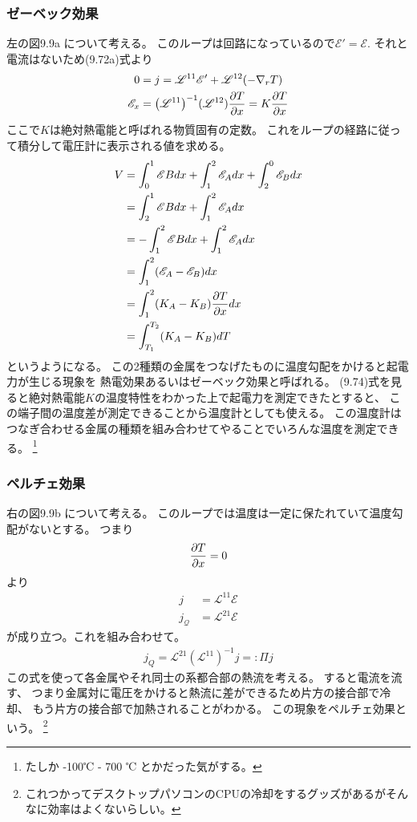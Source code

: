 \documentclass[11pt,dvipdfmx,a4paper]{jsarticle}
\begin{document}
\subsubsection*{ゼーベック効果}
左の図9.9a について考える。
このループは回路になっているので\(\mathscr{E}'=\mathscr{E}\).
それと電流はないため(9.72a)式より
\begin{align}
    0 &= j = \mathscr{L}^{11} \mathscr{E}' + \mathscr{L}^{12}(-\nabla_r T)\\ %
    \mathscr{E}_x &= \qty(\mathscr{L}^{11})^{-1}(\mathscr{L}^{12})\pdv{T}{x}
    = K \pdv{T}{x} %
\end{align}
ここで\(K\)は絶対熱電能と呼ばれる物質固有の定数。
これをループの経路に従って積分して電圧計に表示される値を求める。
\begin{align}
    V &= \int_0^1 \mathscr{E} B dx + \int_1^2 \mathscr{E}_A dx + \int_2^0 \mathscr{E}_B dx\\
    &= \int_2^1 \mathscr{E} B dx + \int_1^2 \mathscr{E}_A dx \\
    &= -\int_1^2 \mathscr{E} B dx + \int_1^2 \mathscr{E}_A dx \\
    &= \int_1^2 (\mathscr{E}_A-\mathscr{E}_B)dx\\
    &= \int_1^2(K_A-K_B)\pdv{T}{x} dx\\
    &= \int_{T_1}^{T_2} (K_A-K_B) dT %
\end{align}
というようになる。
この2種類の金属をつなげたものに温度勾配をかけると起電力が生じる現象を
熱電効果あるいはゼーベック効果と呼ばれる。
(9.74)式を見ると絶対熱電能\(K\)の温度特性をわかった上で起電力を測定できたとすると、
この端子間の温度差が測定できることから温度計としても使える。
この温度計はつなぎ合わせる金属の種類を組み合わせてやることでいろんな温度を測定できる。
\footnote{たしか -100℃ - 700 ℃ とかだった気がする。}

\subsubsection*{ペルチェ効果}
右の図9.9b について考える。
このループでは温度は一定に保たれていて温度勾配がないとする。
つまり
\begin{align}
    \pdv{T}{x} = 0
\end{align}
より
\begin{align}
    j &= \mathscr{L}^{11}\mathscr{E}\\
    j_\mathcal{Q} &= \mathscr{L}^{21} \mathscr{E} %
\end{align}
が成り立つ。これを組み合わせて。
\begin{align}
    j_Q = \mathscr{L}^{21}(\mathscr{L}^{11})^{-1} j =: \Pi j %
\end{align}
この式を使って各金属やそれ同士の系都合部の熱流を考える。
すると電流を流す、
つまり金属対に電圧をかけると熱流に差ができるため片方の接合部で冷却、
もう片方の接合部で加熱されることがわかる。
この現象をペルチェ効果という。
\footnote{これつかってデスクトップパソコンのCPUの冷却をするグッズがあるがそんなに効率はよくないらしい。}
\end{document}
